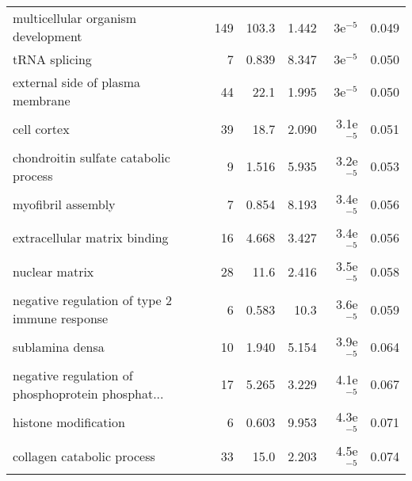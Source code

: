 \begin{longtable}{lrrrrr}
                multicellular organism development &                     149 &                   103.3 &      1.442 &            3e$^{-5}$ &                0.049 \\
                                     tRNA splicing &                       7 &                   0.839 &      8.347 &            3e$^{-5}$ &                0.050 \\
                  external side of plasma membrane &                      44 &                    22.1 &      1.995 &            3e$^{-5}$ &                0.050 \\
                                       cell cortex &                      39 &                    18.7 &      2.090 &          3.1e$^{-5}$ &                0.051 \\
             chondroitin sulfate catabolic process &                       9 &                   1.516 &      5.935 &          3.2e$^{-5}$ &                0.053 \\
                                myofibril assembly &                       7 &                   0.854 &      8.193 &          3.4e$^{-5}$ &                0.056 \\
                      extracellular matrix binding &                      16 &                   4.668 &      3.427 &          3.4e$^{-5}$ &                0.056 \\
                                    nuclear matrix &                      28 &                    11.6 &      2.416 &          3.5e$^{-5}$ &                0.058 \\
     negative regulation of type 2 immune response &                       6 &                   0.583 &       10.3 &          3.6e$^{-5}$ &                0.059 \\
                                   sublamina densa &                      10 &                   1.940 &      5.154 &          3.9e$^{-5}$ &                0.064 \\
 negative regulation of phosphoprotein phosphat... &                      17 &                   5.265 &      3.229 &          4.1e$^{-5}$ &                0.067 \\
                              histone modification &                       6 &                   0.603 &      9.953 &          4.3e$^{-5}$ &                0.071 \\
                        collagen catabolic process &                      33 &                    15.0 &      2.203 &          4.5e$^{-5}$ &                0.074 \\

\end{longtable}
